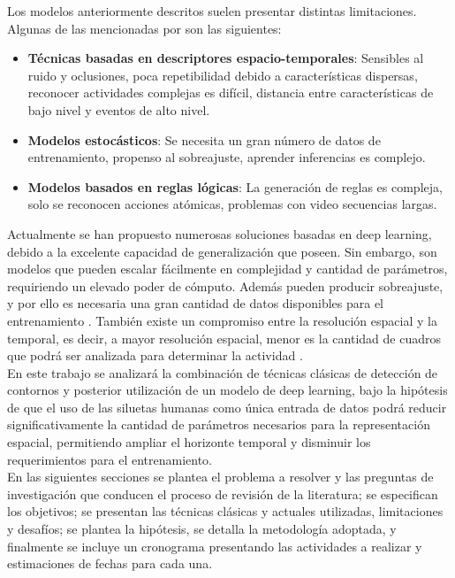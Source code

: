 Los modelos anteriormente descritos suelen presentar distintas limitaciones. Algunas de las mencionadas por \citep{Vrigkas2015} son las siguientes:
\begin{itemize}
	\item \textbf{Técnicas basadas en descriptores espacio-temporales}: Sensibles al ruido y oclusiones, poca repetibilidad debido a características dispersas, reconocer actividades complejas es difícil, distancia entre características de bajo nivel y eventos de alto nivel.
	\item \textbf{Modelos estocásticos}: Se necesita un gran número de datos de entrenamiento, propenso al sobreajuste, aprender inferencias es complejo.
	\item \textbf{Modelos basados en reglas lógicas}: La generación de reglas es compleja, solo se reconocen acciones atómicas, problemas con video secuencias largas.
\end{itemize}

Actualmente se han propuesto numerosas soluciones basadas en deep learning, debido a la excelente capacidad de generalización que poseen. Sin embargo, son modelos que pueden escalar fácilmente en complejidad y cantidad de parámetros, requiriendo un elevado poder de cómputo. Además pueden producir sobreajuste, y por ello es necesaria una gran cantidad de datos disponibles para el entrenamiento \citep{Beddiar2020}. También existe un compromiso entre la resolución espacial y la temporal, es decir, a mayor resolución espacial, menor es la cantidad de cuadros que podrá ser analizada para determinar la actividad \citep{Asadi-Aghbolaghi2017}. \\

En este trabajo se analizará la combinación de técnicas clásicas de detección de contornos y posterior utilización de un modelo de deep learning, bajo la hipótesis de que el uso de las siluetas humanas como única entrada de datos podrá reducir significativamente la cantidad de parámetros necesarios para la representación espacial, permitiendo ampliar el horizonte temporal y disminuir los requerimientos para el entrenamiento. \\

En las siguientes secciones se plantea el problema a resolver y las preguntas de investigación que conducen el proceso de revisión de la literatura; se especifican los objetivos; se presentan las técnicas clásicas y actuales utilizadas, limitaciones y desafíos; se plantea la hipótesis, se detalla la metodología adoptada, y finalmente se incluye un cronograma presentando las actividades a realizar y estimaciones de fechas para cada una. \\

